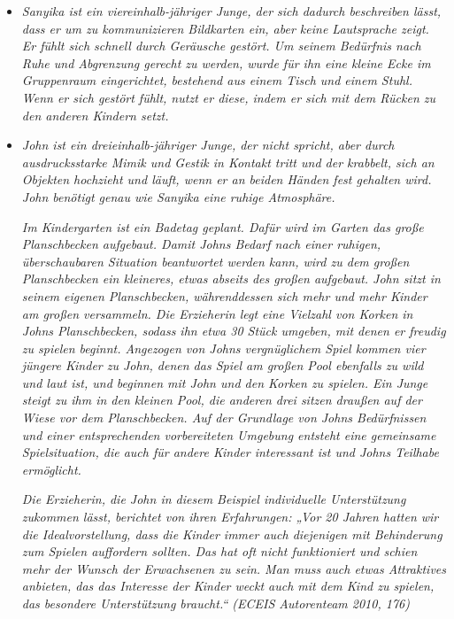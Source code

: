 \begin{itemize}
\item \emph{Sanyika ist ein viereinhalb-jähriger Junge, der sich  dadurch beschreiben lässt, dass er um zu kommunizieren Bildkarten ein, aber keine Lautsprache zeigt. Er fühlt sich schnell durch Geräusche gestört. Um seinem Bedürfnis nach Ruhe und Abgrenzung gerecht zu werden, wurde für ihn eine kleine Ecke im Gruppenraum eingerichtet, bestehend aus einem Tisch und einem Stuhl. Wenn er sich gestört fühlt, nutzt er diese, indem er sich mit dem Rücken zu den anderen Kindern setzt.} 

\item \emph{John ist ein dreieinhalb-jähriger Junge, der nicht spricht, aber durch ausdrucksstarke Mimik und Gestik in Kontakt tritt und der krabbelt, sich an Objekten hochzieht und läuft, wenn er an beiden Händen fest gehalten wird. John benötigt genau wie Sanyika eine ruhige Atmosphäre.} 

\emph{Im Kindergarten ist ein Badetag geplant. Dafür wird im Garten das große Planschbecken aufgebaut. Damit Johns Bedarf nach einer ruhigen, überschaubaren Situation beantwortet werden kann, wird zu dem großen Planschbecken ein kleineres, etwas abseits des großen aufgebaut. John sitzt in seinem eigenen Planschbecken, währenddessen sich mehr und mehr Kinder am großen versammeln. Die Erzieherin legt eine Vielzahl von Korken in Johns Planschbecken, sodass ihn etwa 30 Stück umgeben, mit denen er freudig zu spielen beginnt. Angezogen von Johns vergnüglichem Spiel kommen vier jüngere Kinder zu John, denen das Spiel am großen Pool ebenfalls zu wild und laut ist, und beginnen mit John und den Korken zu spielen. Ein Junge steigt zu ihm in den kleinen Pool, die anderen drei sitzen draußen auf der Wiese vor dem Planschbecken. 
Auf der Grundlage von Johns Bedürfnissen und einer entsprechenden vorbereiteten Umgebung entsteht eine gemeinsame Spielsituation, die auch für andere Kinder interessant ist und Johns Teilhabe ermöglicht.}

\emph{Die Erzieherin, die John in diesem Beispiel individuelle Unterstützung zukommen lässt, berichtet von ihren Erfahrungen: „Vor 20 Jahren hatten wir die Idealvorstellung, dass die Kinder immer auch diejenigen mit Behinderung zum Spielen auffordern sollten. Das hat oft nicht funktioniert und schien mehr der Wunsch der Erwachsenen zu sein. Man muss auch etwas Attraktives anbieten, das das Interesse der Kinder weckt auch mit dem Kind zu spielen, das besondere Unterstützung braucht.“ (ECEIS Autorenteam 2010, 176)}
\end{itemize}

